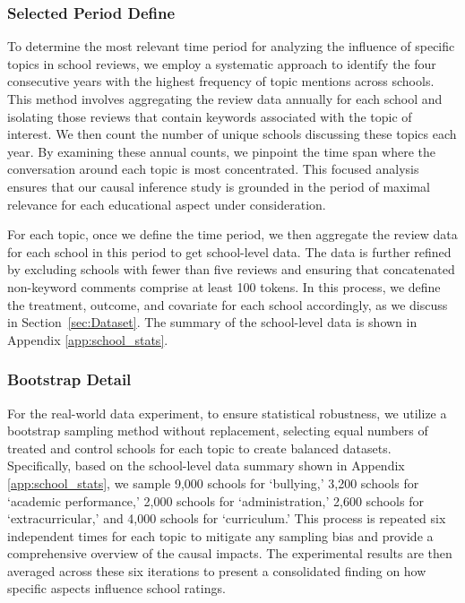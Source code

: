 \documentclass[11pt]{article}
\begin{document}
\subsubsection{Selected Period Define}
To determine the most relevant time period for analyzing the influence of specific topics in school reviews, we employ a systematic approach to identify the four consecutive years with the highest frequency of topic mentions across schools. This method involves aggregating the review data annually for each school and isolating those reviews that contain keywords associated with the topic of interest. We then count the number of unique schools discussing these topics each year. By examining these annual counts, we pinpoint the time span where the conversation around each topic is most concentrated. This focused analysis ensures that our causal inference study is grounded in the period of maximal relevance for each educational aspect under consideration. 

For each topic, once we define the time period, we then aggregate the review data for each school in this period to get school-level data. The data is further refined by excluding schools with fewer than five reviews and ensuring that concatenated non-keyword comments comprise at least 100 tokens. In this process, we define the treatment, outcome, and covariate for each school accordingly, as we discuss in Section~\ref{sec:Dataset}. The summary of the school-level data is shown in Appendix \ref{app:school_stats}.

\subsubsection{Bootstrap Detail}
For the real-world data experiment, to ensure statistical robustness, we utilize a bootstrap sampling method without replacement, selecting equal numbers of treated and control schools for each topic to create balanced datasets. Specifically, based on the school-level data summary shown in Appendix \ref{app:school_stats}, we sample 9,000 schools for `bullying,' 3,200 schools for `academic performance,' 2,000 schools for `administration,' 2,600 schools for `extracurricular,' and 4,000 schools for `curriculum.' This process is repeated six independent times for each topic to mitigate any sampling bias and provide a comprehensive overview of the causal impacts. The experimental results are then averaged across these six iterations to present a consolidated finding on how specific aspects influence school ratings. %
\end{document}

